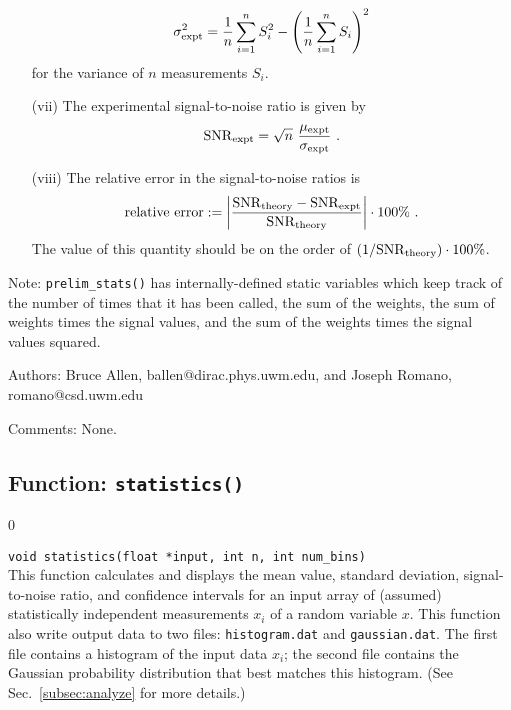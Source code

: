 \begin{itemize}
\begin{equation}
\sigma^2_{\rm expt}={1\over n}\sum_{i=1}^n S_i^2-
\left({1\over n}\sum_{i=1}^n S_i\right)^2
\end{equation}
%
for the variance of $n$ measurements $S_i$.
%
\item[(vii)] The experimental signal-to-noise ratio is given 
by
%
\begin{equation}
{\rm SNR}_{\rm expt}=\sqrt{n}\ {\mu_{\rm expt}\over
\sigma_{\rm expt}}\ .
\end{equation}
%
\item[(viii)] The relative error in the signal-to-noise 
ratios is
%
\begin{equation}
{\rm relative\ error}:=\left|
{{\rm SNR}_{\rm theory}-{\rm SNR}_{\rm expt}\over
{\rm SNR}_{\rm theory}}\right|\cdot 100\%\ .
\end{equation}
%
The value of this quantity should be on the order of 
$(1/{\rm SNR}_{\rm theory})\cdot 100\%$.
\end{itemize}
%

Note: {\tt prelim\_stats()} has internally-defined static variables 
which keep track of the number of times that it has been called, the 
sum of the weights, the sum of weights times the signal values, and 
the sum of the weights times the signal values squared.
%
\begin{description}
\item{Authors:}
Bruce Allen, ballen@dirac.phys.uwm.edu, and Joseph Romano, romano@csd.uwm.edu
\item{Comments:} 
None.
\end{description}
\clearpage

\subsection{Function: {\tt statistics()}}
\label{subsec:statistics}
\setcounter{equation}0

{\tt void statistics(float *input, int n, int num\_bins)}\\
%
This function calculates and displays the mean 
value, standard deviation, signal-to-noise ratio, and confidence 
intervals for an input array
of (assumed) statistically independent measurements $x_i$ of a 
random variable $x$.
This function also write output data to two files:
{\tt histogram.dat} and {\tt gaussian.dat}.
The first file contains a histogram of the input data $x_i$;
the second file contains the Gaussian probability distribution 
that best matches this histogram.
(See Sec.~\ref{subsec:analyze} for more details.)

